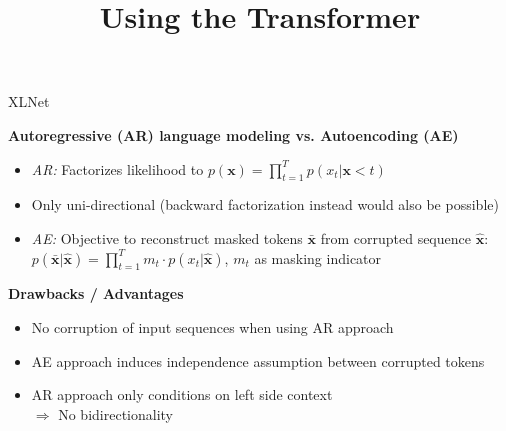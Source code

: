 



\newcommand{\titlefigure}{figure/sesamestreet.jpeg}
\newcommand{\learninggoals}{
\item Understand the improvements over BERT
\item Permutation language modeling
\item }

\title{Using the Transformer}
\date{}




\begin{frame}{XLNet \href{https://papers.nips.cc/paper/8812-xlnet-generalized-autoregressive-pretraining-for-language-understanding.pdf}{}}

	\textbf{Autoregressive (AR) language modeling vs. Autoencoding (AE)}
	
	\begin{itemize}
		\item \textit{AR:} Factorizes likelihood to $p(\mathbf{x}) = \prod_{t=1}^{T} p(x_t | \mathbf{x}{< t})$
		\item Only uni-directional (backward factorization instead would also be possible)
		\item \textit{AE:} Objective to reconstruct masked tokens $\bar{\mathbf{x}}$ from corrupted sequence $\hat{\mathbf{x}}$:
					$p(\bar{\mathbf{x}}|\hat{\mathbf{x}}) = \prod_{t=1}^{T} m_t \cdot p(x_t | \hat{\mathbf{x}})$, $m_t$ as masking indicator
	\end{itemize}

	\vspace{.3cm}
	
	\textbf{Drawbacks / Advantages}
	
	\begin{itemize}
		\item No corruption of input sequences when using AR approach
		\item AE approach induces independence assumption between corrupted tokens
		\item AR approach only conditions on left side context\\$\Rightarrow$ No bidirectionality
	\end{itemize}
\end{frame}

